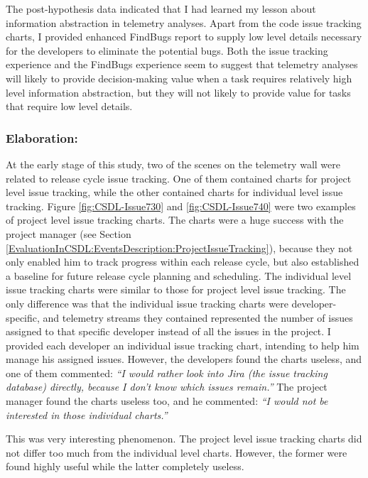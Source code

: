 The post-hypothesis data indicated that I had learned my lesson about information abstraction in telemetry analyses. Apart from the code issue tracking charts, I provided enhanced FindBugs report to supply low level details necessary for the developers to eliminate the potential bugs.
Both the issue tracking experience and the FindBugs experience seem to suggest that telemetry analyses will likely to provide decision-making value when a task requires relatively high level information abstraction, but they will not likely to provide value for tasks that require low level details.

\subsubsection{Elaboration:}


At the early stage of this study, two of the scenes on the telemetry wall were related to release cycle issue tracking. One of them contained charts for project level issue tracking, while the other contained charts for individual level issue tracking. 
Figure \ref{fig:CSDL-Issue730} and \ref{fig:CSDL-Issue740} were two examples of project level issue tracking charts. The charts were a huge success with the project manager (see Section \ref{EvaluationInCSDL:EventsDescription:ProjectIssueTracking}), because they not only enabled him to track progress within each release cycle, but also established a baseline for future release cycle planning and scheduling.
The individual level issue tracking charts were similar to those for project level issue tracking. The only difference was that the individual issue tracking charts were developer-specific, and telemetry streams they contained represented the number of issues assigned to that specific developer instead of all the issues in the project. I provided each developer an individual issue tracking chart, intending to help him manage his assigned issues. However, the developers found the charts useless, and one of them commented: \textit{``I would rather look into Jira (the issue tracking database) directly, because I don't know which issues remain.''} The project manager found the charts useless too, and he commented: \textit{``I would not be interested in those individual charts.''}  

This was very interesting phenomenon. The project level issue tracking charts did not differ too much from the individual level charts. However, the former were found highly useful while the latter completely useless. 


